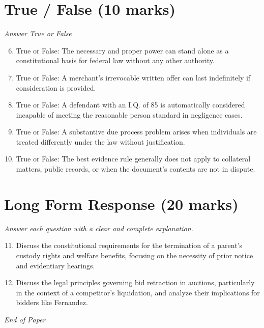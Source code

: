 \documentclass[12pt]{article}
\begin{document}
\section*{True / False (10 marks)}
\textit{Answer True or False}
\begin{enumerate}[label=\arabic*.]
\setcounter{enumi}{5}
\item True or False: The necessary and proper power can stand alone as a constitutional basis for federal law without any other authority.
\item True or False: A merchant's irrevocable written offer can last indefinitely if consideration is provided.
\item True or False: A defendant with an I.Q. of 85 is automatically considered incapable of meeting the reasonable person standard in negligence cases.
\item True or False: A substantive due process problem arises when individuals are treated differently under the law without justification.
\item True or False: The best evidence rule generally does not apply to collateral matters, public records, or when the document's contents are not in dispute.
\end{enumerate}

\section*{Long Form Response (20 marks)}
\textit{Answer each question with a clear and complete explanation.}
\begin{enumerate}[label=\arabic*.]
\setcounter{enumi}{10}
\item Discuss the constitutional requirements for the termination of a parent's custody rights and welfare benefits, focusing on the necessity of prior notice and evidentiary hearings.
\item Discuss the legal principles governing bid retraction in auctions, particularly in the context of a competitor's liquidation, and analyze their implications for bidders like Fernandez.
\end{enumerate}

\vfill
\noindent\textit{End of Paper}
\end{document}
